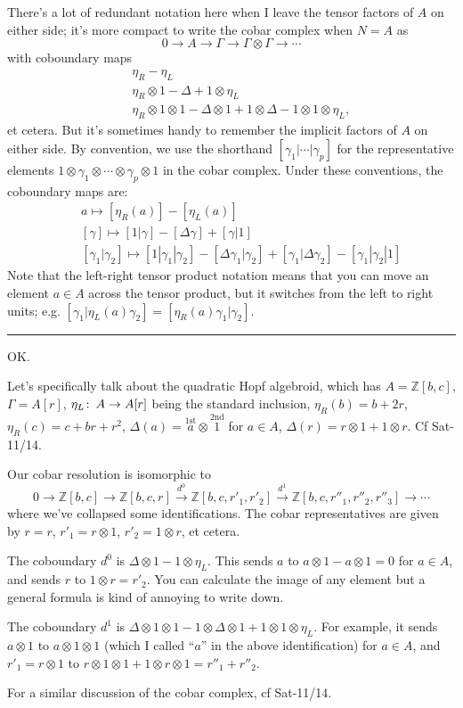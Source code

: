 \documentclass[12pt]{article}
\theoremstyle{definition}
\theoremstyle{remark}
\def\co{\colon\thinspace}
\newcommand{\mb}[1]{\mathbb{#1}}
\begin{document}
There's a lot of redundant notation here when I leave the tensor
factors of $A$ on either side; it's more compact to write the cobar
complex when $N=A$ as
\[
0 \to A \to \Gamma \to \Gamma \otimes \Gamma \to \cdots
\]
with coboundary maps
\begin{eqnarray*}
&&\eta_R - \eta_L\\
&&\eta_R \otimes 1 - \Delta + 1 \otimes \eta_L\\
&&\eta_R \otimes 1 \otimes 1 - \Delta \otimes 1 + 1 \otimes \Delta - 1
\otimes 1 \otimes \eta_L,
\end{eqnarray*}
et cetera.  But it's sometimes handy to remember the implicit factors
of $A$ on either side.  By convention, we use the shorthand $[\gamma_1 |
\cdots | \gamma_p]$ for the representative elements $1 \otimes
\gamma_1 \otimes \cdots \otimes \gamma_p \otimes 1$ in the cobar
complex.  Under these conventions, the coboundary maps are:
\begin{eqnarray*}
&&a \mapsto [\eta_R(a)] - [\eta_L(a)]\\
&&[\gamma] \mapsto [1|\gamma] - [\Delta \gamma] + [\gamma|1]\\
&&[\gamma_1|\gamma_2] \mapsto [1|\gamma_1|\gamma_2] - [\Delta \gamma_1
| \gamma_2] + [\gamma_1 | \Delta \gamma_2 ] - [\gamma_1 | \gamma_2 | 1]
\end{eqnarray*}
Note that the left-right tensor product notation means that you can
move an element $a \in A$ across the tensor product, but it switches
from the left to right units; e.g. $[\gamma_1 | \eta_L(a) \gamma_2] =
[\eta_R(a) \gamma_1 | \gamma_2]$.
\\
\hrule

OK.

Let's specifically talk about the quadratic Hopf algebroid, which has
$A = \mb Z[b,c]$, $\Gamma = A[r]$, $\eta_L\co A \to A[r]$ being the
standard inclusion, $\eta_R(b) = b + 2r$, $\eta_R(c) = c + br + r^2$,
$\Delta(a) = \stackrel{\text{1st}}{a} \otimes \stackrel{\text{2nd}}{1}$ for $a \in A$, $\Delta(r) = r \otimes 1 + 1 \otimes r$. Cf Sat-11/14.

Our cobar resolution is isomorphic to
\[
0 \to \mb Z[b,c] \to \mb Z[b,c,r] \stackrel{d^0}{\to} \mb Z[b,c,r'_1, r'_2] \stackrel{d^1}{\to} \mb Z[b,c,r''_1,r''_2,r''_3]
\to \cdots
\]
where we've collapsed some identifications.  The cobar representatives
are given by $r = r$, $r'_1 = r\otimes 1$, $r'_2 = 1\otimes r$, et cetera.

The coboundary $d^0$ is $\Delta \otimes 1 - 1 \otimes \eta_L$.  This
sends $a$ to $a\otimes 1 - a \otimes 1 = 0$ for $a \in A$, and sends $r$
to $1 \otimes r = r'_2$.  You can calculate the image of any element
but a general formula is kind of annoying to write down.

The coboundary $d^1$ is $\Delta \otimes 1 \otimes 1 - 1 \otimes \Delta
\otimes 1 + 1 \otimes 1 \otimes \eta_L$.  For example, it sends $a
\otimes 1$ to $a \otimes 1 \otimes 1$ (which I called ``$a$'' in the
above identification) for $a \in A$, and $r'_1 = r \otimes 1$ to $r
\otimes 1 \otimes 1 + 1 \otimes r \otimes 1 = r''_1 + r''_2$.

For a similar discussion of the cobar complex, cf Sat-11/14.
\end{document}
